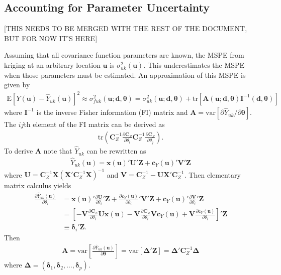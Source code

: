 \documentclass[12pt]{article}
\newcommand{\var}{\mathrm{var}}
\newcommand{\E}{\mathrm{E}}
\newcommand{\tr}{\mathrm{tr}}
\begin{document}
\subsection{Accounting for Parameter Uncertainty}
[THIS NEEDS TO BE MERGED WITH THE REST OF THE DOCUMENT, BUT FOR NOW IT'S HERE]

Assuming that all covariance function parameters are known, the MSPE from kriging at an arbitrary location $\bm{u}$ is $\sigma_{uk}^2(\bm{u})$. This underestimates the MSPE when those parameters must be estimated. An approximation of this MSPE is given by \citep{zimmerman1992mean,abt1999estimating}
\begin{align*}
\E[Y(\bm{u}) - \widehat{Y}_{uk}(\bm{u})]^2 \approx \sigma^2_{fuk}(\bm{u};\bm{d},\bm{\theta}) = \sigma^2_{uk}(\bm{u};\bm{d},\bm{\theta}) + \tr[\bm{A}(\bm{u};\bm{d},\bm{\theta})\bm{I}^{-1}(\bm{d},\bm{\theta})]
\end{align*}
where $\bm{I}^{-1}$ is the inverse Fisher information (FI) matrix and $\bm{A} = \var[\partial \widehat{Y}_{uk} /\partial \bm{\theta}]$. The $ij$th element of the FI matrix can be derived as
\begin{align*}
\tr\left(\bm{C}_Z^{-1}\frac{\partial\bm{C}_Z}{\partial\theta_i}\bm{C}_Z^{-1}\frac{\partial\bm{C}_Z}{\partial\theta_j}\right).
\end{align*}
To derive $\bm{A}$ note that $\widehat{Y}_{uk}$ can be rewritten as
\begin{align*}
\widehat{Y}_{uk}(\bm{u}) = \bm{x}(\bm{u})'\bm{U}'\bm{Z} + \bm{c}_Y(\bm{u})'\bm{V}'\bm{Z}
\end{align*}
where $\bm{U} = \bm{C}_Z^{-1}\bm{X}(\bm{X}'\bm{C}_Z^{-1}\bm{X})^{-1}$ and $\bm{V} = \bm{C}_Z^{-1} - \bm{U}\bm{X}'\bm{C}_Z^{-1}$. Then elementary matrix calculus yields
\begin{align*}
\frac{\partial \widehat{Y}_{uk}(\bm{u})}{\partial \theta_i} &= \bm{x}(\bm{u})'\frac{\partial \bm{U}}{\partial \theta_i}'\bm{Z} + \frac{\partial \bm{c}_Y(\bm{u})}{\partial \theta_i}'\bm{V}'\bm{Z} + \bm{c}_Y(\bm{u})'\frac{\partial \bm{V}}{\partial \theta_i}'\bm{Z}\\
&= \left[-\bm{V}\frac{\partial \bm{C}_Z}{\partial \theta_i}\bm{U}\bm{x}(\bm{u}) - \bm{V}\frac{\partial \bm{C}_Z}{\partial \theta_i}\bm{V}\bm{c}_Y(\bm{u}) + \bm{V}\frac{\partial \bm{c}_Y(\bm{u})}{\partial \theta_i}\right]'\bm{Z}\\
&\equiv\bm{\delta}_i'\bm{Z}.
\end{align*}
Then 
\begin{align*}
\bm{A} = \var\left[\frac{\partial \widehat{Y}_{uk}(\bm{u})}{\partial \bm{\theta}}\right] = \var[\bm{\Delta}'\bm{Z}] = \bm{\Delta}'\bm{C}_Z^{-1}\bm{\Delta}
\end{align*}
where $\bm{\Delta} = (\bm{\delta}_1, \bm{\delta}_2, \dots, \bm{\delta}_p)$.
\end{document}
